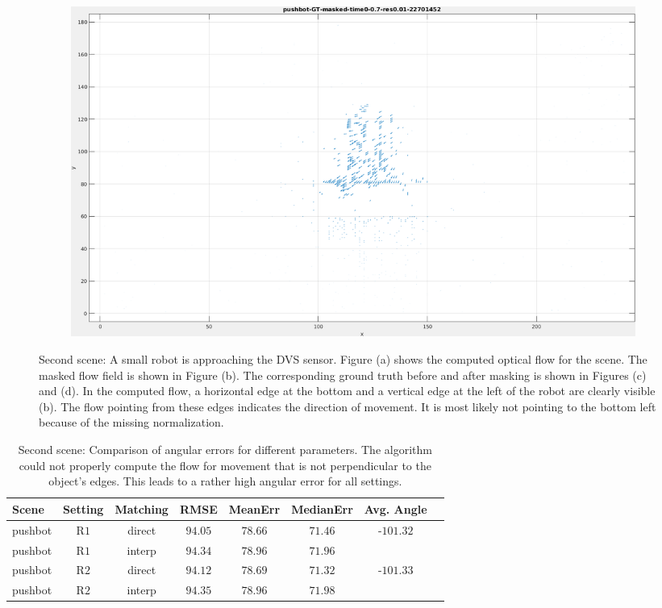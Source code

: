 \begin{figure}[tb]
\begin{subfigure}{.45\textwidth}
  \caption{}
\end{subfigure}
\begin{subfigure}{.45\textwidth}
  \centering
  \includegraphics[height=.6\linewidth]{figs/pushbot/pushbot-GT-masked-1.png}
  \caption{}
\end{subfigure}
\caption[Second scene: Robot approaching the DVS sensor.]{Second scene: A small robot is approaching the DVS sensor. 
Figure (a) shows the computed optical flow for the scene. 
The masked flow field is shown in Figure (b).
The corresponding ground truth before and after masking is shown in Figures (c) and (d). 
In the computed flow, a horizontal edge at the bottom and a vertical edge at the left of the robot are clearly visible (b).
The flow pointing from these edges indicates the direction of movement. 
It is most likely not pointing to the bottom left because of the missing normalization.}
\label{fig:pushbot-snapshots}
\end{figure}

\begin{table}[tb]
	\centering
		\begin{tabular}{lccccccc}
Scene & Setting & Matching & RMSE & MeanErr & MedianErr & Avg. Angle \\
\hline  \hline
pushbot & R$1$ & direct & $94.05$ & $78.66$ & $71.46$ & -$101.32$ & \\
pushbot & R$1$ & interp & $94.34$ & $78.96$ & $71.96$ &  & \\
pushbot & R$2$ & direct & $94.12$ & $78.69$ & $71.32$ & -$101.33$ & \\
pushbot & R$2$ & interp & $94.35$ & $78.96$ & $71.98$ &  & \\
		\end{tabular}
	\caption[Second scene: Comparison of angular errors for different parameters.]{Second scene: Comparison of angular errors for different parameters. The algorithm could not properly compute the flow for movement that is not perpendicular to the object's edges. This leads to a rather high angular error for all settings.}
	\label{tab:error_comparison_pushbot}
\end{table}

